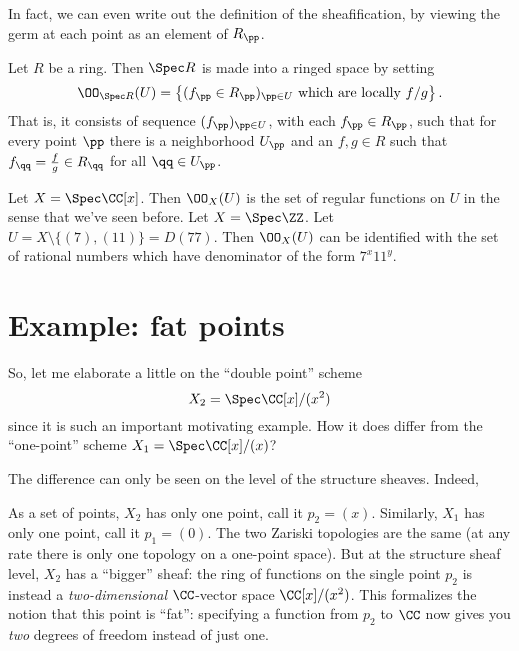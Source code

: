 In fact, we can even write out the definition of the sheafification,
by viewing the germ at each point as an element of $R_\pp$.
\begin{definition}
	Let $R$ be a ring. Then $\Spec R$ is made into a ringed space by setting
	\[ \OO_{\Spec R}(U)
		= \left\{ (f_\pp \in R_\pp)_{\pp \in U}
		\text{ which are locally $f/g$} \right\}. \]
	That is, it consists of sequence $(f_\pp)_{\pp \in U}$, with
	each $f_\pp \in R_\pp$, such that for every point $\pp$ there
	is a neighborhood $U_\pp$ and an $f,g \in R$ such that
	$f_\qq = \frac fg \in R_\qq$ for all $\qq \in U_\pp$.
\end{definition}

\begin{example}
	\listhack
	\begin{enumerate}[(a)]
		\ii Let $X = \Spec \CC[x]$.
		Then $\OO_X(U)$ is the set of regular functions on $U$
		in the sense that we've seen before.
		\ii Let $X = \Spec \ZZ$.
		Let $U = X \setminus \{ (7), (11) \} = D(77)$.
		Then $\OO_X(U)$ can be identified with the set of rational numbers
		which have denominator of the form $7^x 11^y$.
	\end{enumerate}
\end{example}


\section{Example: fat points}
So, let me elaborate a little on the ``double point'' scheme
\[ X_2 = \Spec \CC[x] / (x^2) \]
since it is such an important motivating example.
How it does differ from the ``one-point'' scheme $X_1 = \Spec \CC[x] / (x)$?

The difference can only be seen on the level of the structure sheaves.
Indeed,
\begin{itemize}
	\ii As a set of points, $X_2$ has only one point, call it $p_2 = (x)$.
	Similarly, $X_1$ has only one point, call it $p_1 = (0)$.
	\ii The two Zariski topologies are the same
	(at any rate there is only one topology on a one-point space).
	\ii But at the structure sheaf level, $X_2$ has a ``bigger'' sheaf:
	the ring of functions on the single point $p_2$ is instead
	a \emph{two-dimensional} $\CC$-vector space $\CC[x]/(x^2)$.
	This formalizes the notion that this point is ``fat'':
	specifying a function from $p_2$ to $\CC$ now gives you
	\emph{two} degrees of freedom instead of just one.
\end{itemize}

